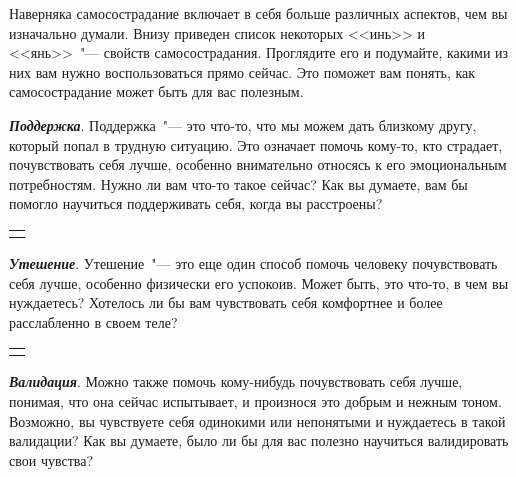 \newpage
{} \label{Ex:What_Aspects_of_Self-Compassion_Do_I_Need Now?}

Наверняка самосострадание включает в себя больше различных аспектов, чем вы изначально думали. Внизу приведен список некоторых <<инь>> и <<янь>>~"--- свойств самосострадания. Проглядите его и подумайте, какими из них вам нужно воспользоваться прямо сейчас. Это поможет вам понять, как самосострадание может быть для вас полезным.

\vspace{3ex}


\begin{itemize}
	\itemyinyang \textit{\textbf{Поддержка}}. Поддержка~"--- это что-то, что мы можем дать близкому другу, который попал в трудную ситуацию. Это означает помочь кому-то, кто страдает, почувствовать себя лучше, особенно внимательно относясь к его эмоциональным потребностям. Нужно ли вам что-то такое сейчас? Как вы думаете, вам бы помогло научиться поддерживать себя, когда вы расстроены?
\end{itemize}

\setlength{\extrarowheight}{2mm}
\begin{tabularx}{\textwidth}{X}
	\\
	\arrayrulecolor{gray}\hline\\
	\hline\\	
\end{tabularx}
\setlength{\extrarowheight}{0mm}
\begin{itemize}
	\itemyinyang \textit{\textbf{Утешение}}. Утешение~"--- это еще один способ помочь человеку почувствовать себя лучше, особенно физически его успокоив. Может быть, это что-то, в чем вы нуждаетесь? Хотелось ли бы вам чувствовать себя комфортнее и более расслабленно в своем теле? 
\end{itemize}

\setlength{\extrarowheight}{2mm}
\begin{tabularx}{\textwidth}{X}
	\\
	\arrayrulecolor{gray}\hline\\
	\hline\\
\end{tabularx}
\setlength{\extrarowheight}{0mm}
\begin{itemize}
	\itemyinyang \textit{\textbf{Валидация}}. Можно также помочь кому-нибудь почувствовать себя лучше, понимая, что она сейчас испытывает, и произнося это добрым и нежным тоном. Возможно, вы чувствуете себя одинокими или непонятыми и нуждаетесь в такой валидации? Как вы думаете, было ли бы для вас полезно научиться валидировать свои чувства?
\end{itemize}

